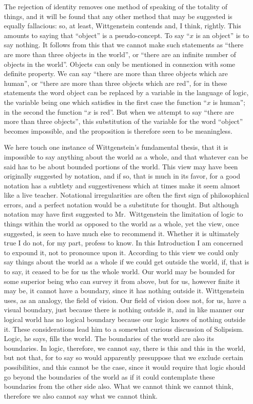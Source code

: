The rejection of identity removes one method of speaking of the totality of things, and it will be found that any other method that may be suggested is equally fallacious: so, at least, Wittgenstein contends and, I think, rightly. This amounts to saying that “object” is a pseudo-concept. To say “$x$ is an object” is to say nothing. It follows from this that we cannot make such statements as “there are more than three objects in the world”, or “there are an infinite number of objects in the world”. Objects can only be mentioned in connexion with some definite property. We can say “there are more than three objects which are human”, or “there are more than three objects which are red”, for in these statements the word object can be replaced by a variable in the language of logic, the variable being one which satisfies in the first case the function “$x$ is human”; in the second the function “$x$ is red”. But when we attempt to say “there are more than three objects”, this substitution of the variable for the word “object” becomes impossible, and the proposition is therefore seen to be meaningless.

We here touch one instance of Wittgenstein’s fundamental thesis, that it is impossible to say anything about the world as a whole, and that whatever can be said has to be about bounded portions of the world. This view may have been originally suggested by notation, and if so, that is much in its favor, for a good notation has a subtlety and suggestiveness which at times make it seem almost like a live teacher. Notational irregularities are often the first sign of philosophical errors, and a perfect notation would be a substitute for thought. But although notation may have first suggested to Mr.\ Wittgenstein the limitation of logic to things within the world as opposed to the world as a whole, yet the view, once suggested, is seen to have much else to recommend it. Whether it is ultimately true I do not, for my part, profess to know. In this Introduction I am concerned to expound it, not to pronounce upon it. According to this view we could only say things about the world as a whole if we could get outside the world, if, that is to say, it ceased to be for us the whole world. Our world may be bounded for some superior being who can survey it from above, but for us, however finite it may be, it cannot have a boundary, since it has nothing outside it. Wittgenstein uses, as an analogy, the field of vision. Our field of vision does not, for us, have a visual boundary, just because there is nothing outside it, and in like manner our logical world has no logical boundary because our logic knows of nothing outside it. These considerations lead him to a somewhat curious discussion of Solipsism. Logic, he says, fills the world. The boundaries of the world are also its boundaries. In logic, therefore, we cannot say, there is this and this in the world, but not that, for to say so would apparently presuppose that we exclude certain possibilities, and this cannot be the case, since it would require that logic should go beyond the boundaries of the world as if it could contemplate these boundaries from the other side also. What we cannot think we cannot think, therefore we also cannot say what we cannot think.

